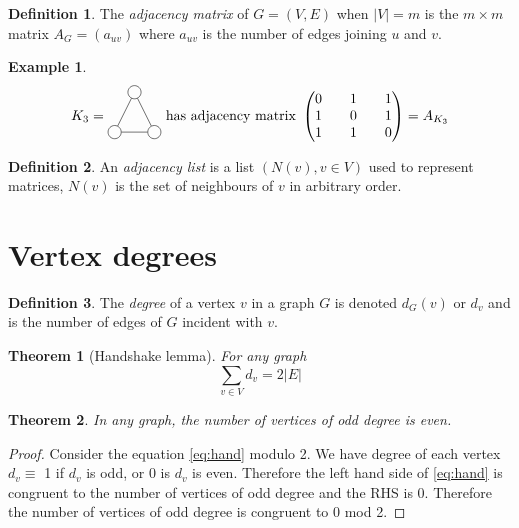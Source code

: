 \documentclass{article}
\newtheorem*{thm}{Theorem}
\theoremstyle{definition}
\newtheorem*{defn}{Definition}
\newtheorem*{ex}{Example}
\begin{document}
\begin{defn}
The \emph{adjacency matrix} of $G = (V,E)$ when $|V| = m$ is the $m\times m$ matrix $A_G = (a_{uv})$ where $a_{uv}$ is the number of edges joining $u$ and $v$.
\end{defn}

\begin{ex}
$$K_3 = 
\begin{tikzpicture}[baseline=2ex]
  \node[draw,circle] (G-1) at (-0.5,0) {};
  \node[draw,circle] (G-2) at (0.5,0) {};
  \node[draw,circle] (G-3) at (0,1) {};
  \draw (G-1) -- (G-2) -- (G-3) -- (G-1);
\end{tikzpicture}
\text{ has adjacency matrix }
\begin{pmatrix}
0 && 1 && 1 \\
1 && 0 && 1 \\
1 && 1 && 0 
\end{pmatrix} = A_{K_{3}}$$
\end{ex}

\begin{defn}
An \emph{adjacency list} is a list $(N(v),v\in V)$ used to represent matrices, $N(v)$ is the set of neighbours of $v$ in arbitrary order.
\end{defn}

\section{Vertex degrees}

\begin{defn}
The \emph{degree} of a vertex $v$ in a graph $G$ is denoted $d_G(v)$ or $d_v$ and is the number of edges of $G$ incident with $v$.
\end{defn}

\begin{thm}[Handshake lemma]
For any graph
\begin{equation} \label{eq:hand}
\sum_{v\in V}d_v = 2|E|
\end{equation}
\end{thm}

\begin{thm}
In any graph, the number of vertices of odd degree is even.
\end{thm}

\begin{proof}
Consider the equation \ref{eq:hand} modulo 2.
We have degree of each vertex $d_v \equiv$ 1 if $d_v$ is odd, or 0 is $d_v$ is even.
Therefore the left hand side of \ref{eq:hand} is congruent to the number of vertices of odd degree and the RHS is 0.
Therefore the number of vertices of odd degree is congruent to 0 mod 2.
\end{proof}
\end{document}
